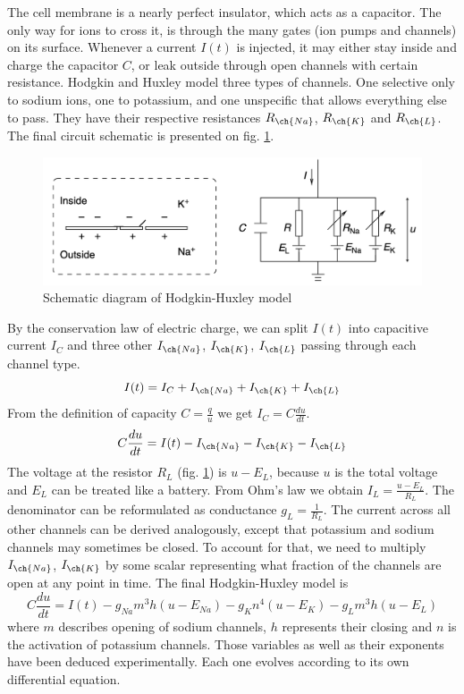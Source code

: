 \documentclass[oneside,english,logo]{amuthesis}
\begin{document}
The cell membrane is a nearly perfect insulator, which acts as a capacitor. The only way for ions to cross it, is through the many gates (ion pumps and channels) on its surface.  Whenever a current $I(t)$ is  injected, it may either stay inside and charge the capacitor $C$, or leak outside through open channels with certain resistance. Hodgkin and Huxley model three types of channels. One selective only to sodium ions, one to potassium, and one unspecific that allows everything else to pass. They have their respective resistances $R_{\ch{Na}}$, $R_{\ch{K}}$ and $R_{\ch{L}}$. The final circuit schematic is presented on fig. \ref{fig:hodgkin_huxley_model}.
\begin{figure}[!htbp]
	\centering
	\includegraphics[width=13cm]{hodgkin_huxley_model}
	\caption{Schematic diagram of  Hodgkin-Huxley model}
	\label{fig:hodgkin_huxley_model}
\end{figure} 
By the conservation law of electric charge, we can split $I(t)$ into capacitive current $I_C$ and three other $I_{\ch{Na}}$, $I_{\ch{K}}$, $I_{\ch{L}}$ passing through each channel type.
\[
I(t) = I_C + I_{\ch{Na}} + I_{\ch{K}} + I_{\ch{L}}
\]
From the definition of capacity $C=\frac{q}{u}$ we get $I_C=C\frac{du}{dt}$.
\[
C \frac{du}{dt} = I(t) - I_{\ch{Na}} - I_{\ch{K}} - I_{\ch{L}}
\]
The voltage at the resistor $R_L$ (fig. \ref{fig:hodgkin_huxley_model}) is $u-E_L$, because $u$ is the total voltage and $E_L$ can be treated like a battery. From Ohm's law we obtain $I_L = \frac{u-E_L}{R_L}$. The denominator can be reformulated as conductance $g_L = \frac{1}{R_L}$. The current across all other channels can be derived analogously, except that potassium and sodium channels may sometimes be closed. To account for that, we need to multiply $ I_{\ch{Na}}$, $I_{\ch{K}} $ by some scalar representing what fraction of the channels are open at any point in time. The final Hodgkin-Huxley model is 
\[
C \frac{du}{dt}  = I(t) - g_{Na}m^3h(u-E_{Na}) - g_{K}n^4(u-E_{K}) - g_{L}m^3h(u-E_{L})
\]
where $m$ describes opening of sodium channels, $h$ represents their closing and $n$ is the activation of potassium channels. Those variables as well as their exponents have been deduced experimentally. Each one evolves according to its own differential equation. 
\end{document}
